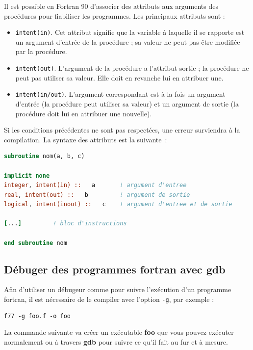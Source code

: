 \documentclass[a4paper,twoside]{article}
\begin{document}
Il est possible en Fortran 90 d'associer des attributs aux arguments des procédures pour fiabiliser les programmes. Les principaux attributs sont : 
\begin{itemize}
\item  \texttt{intent(in)}. Cet attribut signifie que la variable à laquelle il se rapporte est un argument d'entrée de la procédure ; sa valeur ne peut pas être modifiée par la procédure. 

\item  \texttt{intent(out)}. L'argument de la procédure a l'attribut sortie ; la procédure ne peut pas utiliser sa valeur. Elle doit en revanche lui en attribuer une.

\item  \texttt{intent(in/out)}. L'argument correspondant est à la fois un argument d'entrée (la procédure peut utiliser sa valeur) et un argument de sortie (la procédure doit lui en attribuer une nouvelle). 
\end{itemize}
Si les conditions précédentes ne sont pas respectées, une erreur surviendra à la compilation. La syntaxe des attributs est la suivante~: 
\begin{lstlisting}[language=Fortran]
subroutine nom(a, b, c)
 
implicit none         
integer, intent(in) ::   a       ! argument d'entree 
real, intent(out) ::   b         ! argument de sortie 
logical, intent(inout) ::   c    ! argument d'entree et de sortie
 
[...]         ! bloc d'instructions
 
end subroutine nom 
\end{lstlisting}

\subsection{Débuger des programmes fortran avec gdb}
Afin d'utiliser un débugeur comme  pour suivre l'exécution d'un programme fortran, il est nécessaire de le compiler avec l'option \texttt{-g}, par exemple : 
\begin{verbatim}
f77 -g foo.f -o foo
\end{verbatim}
La commande suivante va créer un exécutable \textbf{foo} que vous pouvez exécuter normalement ou à travers \textbf{gdb} pour suivre ce qu'il fait au fur et à mesure.

\bigskip
\end{document}
